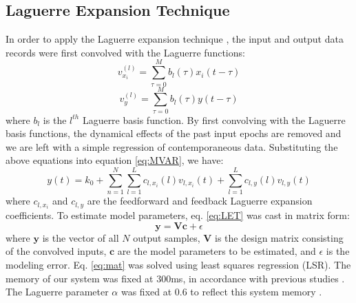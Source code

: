 \documentclass[11pt,a4paper,final]{article}
\begin{document}
    \subsection{Laguerre Expansion Technique}  %

In order to apply the Laguerre expansion technique \citep{marm04}, the input and output data records were first convolved with the Laguerre functions:
\begin{equation}
    v_{x_{i}}^{(l)}=\sum_{\tau=0}^{M}b_{l}(\tau)x_{i}(t-\tau)
\end{equation}
\begin{equation}
    v_{y}^{(l)}=\sum_{\tau=0}^{M}b_{l}(\tau)y(t-\tau)
\end{equation}
where $b_{l}$ is the $l^{th}$ Laguerre basis function.
By first convolving with the Laguerre basis functions, the dynamical effects of the past input epochs are removed and we are left with a simple regression of contemporaneous data.
Substituting the above equations into equation \ref{eq:MVAR}, we have:
\begin{equation}
    y(t)=k_{0}+\sum_{n=1}^{N}\sum_{l=1}^{L}c_{l,x_{i}}(l)v_{l,x_{i}}(t)+\sum_{l=1}^{L}c_{l,y}(l)v_{l,y}(t)
\label{eq:LET}
\end{equation}
where $c_{l,x_{i}}$ and $c_{l,y}$ are the feedforward and feedback Laguerre expansion coefficients.
To estimate model parameters, eq. \ref{eq:LET} was cast in matrix form:
\begin{equation}
    \bm{y}=\bm{Vc}+\epsilon
\label{eq:mat}
\end{equation}
where $\bm{y}$ is the vector of all $N$ output samples, $\bm{V}$ is the design matrix consisting of the convolved inputs, $\bm{c}$ are the model parameters to be estimated, and $\epsilon$ is the modeling error.
Eq. \ref{eq:mat} was solved using least squares regression (LSR).
The memory of our system was fixed at 300ms, in accordance with previous studies \citep{song07,lu11}.
The Laguerre parameter $\alpha$ was fixed at 0.6 to reflect this system memory \citep{marm04}.
\end{document}
